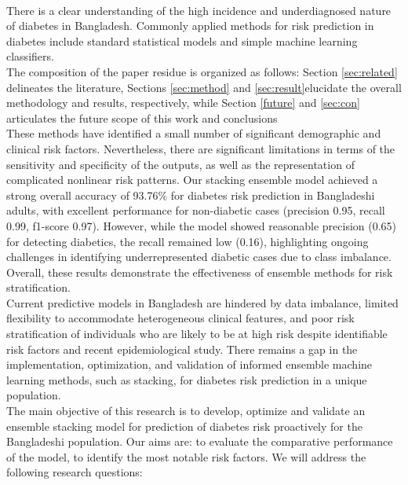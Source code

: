 \documentclass[conference, letterpaper]{IEEEtran}
\begin{document}
\\
There is a clear understanding of the high incidence and underdiagnosed nature of diabetes in Bangladesh\cite{pmc11964274}. Commonly applied methods for risk prediction in diabetes include standard statistical models and simple machine learning classifiers\cite{bayesianbangladesh}.\\
The composition of the paper residue is organized as follows: Section \ref{sec:related} delineates the literature, Sections  \ref{sec:method} and \ref{sec:result}elucidate the overall methodology and results, respectively, while Section \ref{future} and \ref{sec:con} articulates the future scope of this work and conclusions\\

These methods have identified a small number of significant demographic and clinical risk factors. Nevertheless, there are significant limitations in terms of the sensitivity and specificity of the outputs, as well as the representation of complicated nonlinear risk patterns.
Our stacking ensemble model achieved a strong overall accuracy of 93.76\% for diabetes risk prediction in Bangladeshi adults, with excellent performance for non-diabetic cases (precision 0.95, recall 0.99, f1-score 0.97). However, while the model showed reasonable precision (0.65) for detecting diabetics, the recall remained low (0.16), highlighting ongoing challenges in identifying underrepresented diabetic cases due to class imbalance. Overall, these results demonstrate the effectiveness of ensemble methods for risk stratification.
\\


Current predictive models in Bangladesh are hindered by data imbalance, limited flexibility to accommodate heterogeneous clinical features, and poor risk stratification of individuals who are likely to be at high risk despite identifiable risk factors and recent epidemiological study. There remains a gap in the implementation, optimization, and validation of informed ensemble machine learning methods, such as stacking, for diabetes risk prediction in a unique population\cite{ensemblebangladesh}.
\\


The main objective of this research is to develop, optimize and validate an ensemble stacking model for prediction of diabetes risk proactively for the Bangladeshi population. Our aims are: to evaluate the comparative performance of the model, to identify the most notable risk factors. We will address the following research questions:\\
\end{document}
